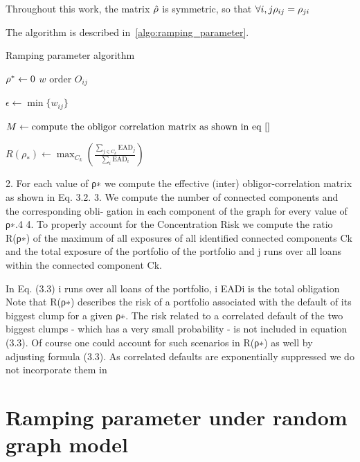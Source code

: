 \begin{remark}
Throughout this work, the matrix $\hat{\rho}$ is symmetric, so that $\forall i,j \rho_{ij} = \rho_{ji}$
\end{remark}

The algorithm is described in~\ref{algo:ramping_parameter}.

\begin{algorithm}
\label{algo:ramping}
\caption{Ramping parameter algorithm~\label{algo:ramping_parameter}}
\State $\rho^* \gets 0$
\State $w$ \gets \textrm{order $O_{ij}$}

\State $\epsilon\gets \min\{w_{ij}\}$

\For{$\ramp$ \in [0,1]}

	$M \gets \textrm{compute the obligor correlation matrix as shown in eq~\ref{}}$

	$R(\rho_*) \gets \max_{C_k} \left(  \frac{\sum_{j\in C_k} \textrm{EAD}_j}{\sum_i \textrm{EAD}_i}  \right)$

\EndFor
\end{algorithm}

2. For each value of ρ∗ we compute the effective (inter) obligor-correlation matrix as shown in Eq. 3.2.
3. We compute the number of connected components and the corresponding obli- gation in each component of the graph for every value of ρ∗.4
4. To properly account for the Concentration Risk we compute the ratio R(ρ∗) of the maximum of all exposures of all identified connected components Ck and the total exposure of the portfolio
of the portfolio and j runs over all loans within the connected component Ck.

In Eq. (3.3) i runs over all loans of the portfolio, i EADi is the total obligation
Note that R(ρ∗) describes the risk of a portfolio associated with the default of its biggest clump for a given ρ∗. The risk related to a correlated default of the two biggest clumps - which has a very small probability - is not included in equation (3.3). Of course one could account for such scenarios in R(ρ∗) as well by adjusting formula (3.3). As correlated defaults are exponentially suppressed we do not incorporate them in



\section{Ramping parameter under random graph model} %
\label{sec:ramping_parameter_under_random_graph_model}


